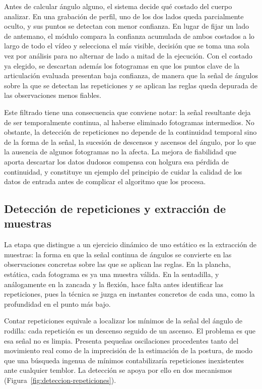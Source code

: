 \documentclass[12pt,a4paper,twoside,openright]{book}
\begin{document}
    Antes de calcular ángulo alguno, el sistema decide qué costado del cuerpo
    analizar. En una grabación de perfil, uno de los dos lados queda parcialmente
    oculto, y sus puntos se detectan con menor confianza. En lugar de fijar un
    lado de antemano, el módulo compara la confianza acumulada de ambos costados
    a lo largo de todo el vídeo y selecciona el más visible, decisión que se toma
    una sola vez por análisis para no alternar de lado a mitad de la ejecución.
    Con el costado ya elegido, se descartan además los fotogramas en que los
    puntos clave de la articulación evaluada presentan baja confianza, de manera
    que la señal de ángulos sobre la que se detectan las repeticiones y se
    aplican las reglas queda depurada de las observaciones menos fiables.

    Este filtrado tiene una consecuencia que conviene notar: la señal resultante
    deja de ser temporalmente continua, al haberse eliminado fotogramas
    intermedios. No obstante, la detección de repeticiones no depende de la
    continuidad temporal sino de la forma de la señal, la sucesión de descensos
    y ascensos del ángulo, por lo que la ausencia de algunos fotogramas no la
    afecta. La mejora de fiabilidad que aporta descartar los datos dudosos
    compensa con holgura esa pérdida de continuidad, y constituye un ejemplo del
    principio de cuidar la calidad de los datos de entrada antes de complicar el
    algoritmo que los procesa.

    \subsection{Detección de repeticiones y extracción de muestras}

    La etapa que distingue a un ejercicio dinámico de uno estático es la
    extracción de muestras: la forma en que la señal continua de ángulos se
    convierte en las observaciones concretas sobre las que se aplican las reglas.
    En la plancha, estática, cada fotograma es ya una muestra válida. En la sentadilla,
    y análogamente en la zancada y la flexión, hace falta antes identificar las repeticiones,
    pues la técnica se juzga en instantes concretos de cada una, como la profundidad en el punto más bajo.

    Contar repeticiones equivale a localizar los mínimos de la señal del ángulo de
    rodilla: cada repetición es un descenso seguido de un ascenso. El problema es
    que esa señal no es limpia. Presenta pequeñas oscilaciones procedentes tanto
    del movimiento real como de la imprecisión de la estimación de la postura, de modo
    que una búsqueda ingenua de mínimos contabilizaría repeticiones inexistentes
    ante cualquier temblor. La detección se apoya por ello en dos mecanismos
    (Figura~\ref{fig:deteccion-repeticiones}).
\end{document}
